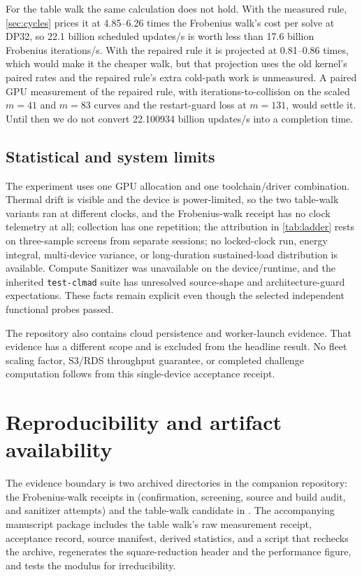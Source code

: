 \documentclass[11pt,a4paper]{article}
\newcommand{\code}[1]{\texttt{\small #1}}
\begin{document}
For the table walk the same calculation does not hold. With the measured rule, \cref{sec:cycles} prices it at 4.85--6.26 times the Frobenius walk's cost per solve at DP32, so 22.1 billion scheduled updates/s is worth less than 17.6 billion Frobenius iterations/s. With the repaired rule it is projected at 0.81--0.86 times, which would make it the cheaper walk, but that projection uses the old kernel's paired rates and the repaired rule's extra cold-path work is unmeasured. A paired GPU measurement of the repaired rule, with iterations-to-collision on the scaled $m=41$ and $m=83$ curves and the restart-guard loss at $m=131$, would settle it. Until then we do not convert 22.100934 billion updates/s into a completion time.

\subsection{Statistical and system limits}
The experiment uses one GPU allocation and one toolchain/driver combination. Thermal drift is visible and the device is power-limited, so the two table-walk variants ran at different clocks, and the Frobenius-walk receipt has no clock telemetry at all; collection has one repetition; the attribution in \cref{tab:ladder} rests on three-sample screens from separate sessions; no locked-clock run, energy integral, multi-device variance, or long-duration sustained-load distribution is available. Compute Sanitizer was unavailable on the device/runtime, and the inherited \code{test-clmad} suite has unresolved source-shape and architecture-guard expectations. These facts remain explicit even though the selected independent functional probes passed.

The repository also contains cloud persistence and worker-launch evidence. That evidence has a different scope and is excluded from the headline result. No fleet scaling factor, S3/RDS throughput guarantee, or completed challenge computation follows from this single-device acceptance receipt.

\section{Reproducibility and artifact availability}
The evidence boundary is two archived directories in the companion repository: the Frobenius-walk receipts in  (confirmation, screening, source and build audit, and sanitizer attempts) and the table-walk candidate in . The accompanying manuscript package includes the table walk's raw measurement receipt, acceptance record, source manifest, derived statistics, and a script that rechecks the archive, regenerates the square-reduction header and the performance figure, and tests the modulus for irreducibility.
\end{document}
